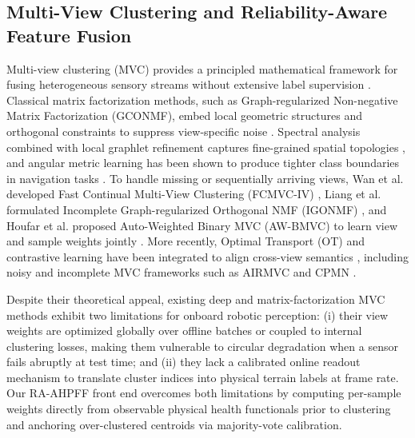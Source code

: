 \documentclass[11pt, a4paper]{article}
\begin{document}
\subsection{Multi-View Clustering and Reliability-Aware Feature Fusion}
Multi-view clustering (MVC) provides a principled mathematical framework for fusing heterogeneous sensory streams without extensive label supervision \cite{wang2024self, chowdhury2025deep, fang2023comprehensive}. Classical matrix factorization methods, such as Graph-regularized Non-negative Matrix Factorization (GCONMF), embed local geometric structures and orthogonal constraints to suppress view-specific noise \cite{zhang2018multi}. Spectral analysis combined with local graphlet refinement captures fine-grained spatial topologies \cite{xu2021multi}, and angular metric learning has been shown to produce tighter class boundaries in navigation tasks \cite{shi2023deep}. To handle missing or sequentially arriving views, Wan et al. developed Fast Continual Multi-View Clustering (FCMVC-IV) \cite{wan2023fast}, Liang et al. formulated Incomplete Graph-regularized Orthogonal NMF (IGONMF) \cite{liang2022incomplete}, and Houfar et al. proposed Auto-Weighted Binary MVC (AW-BMVC) to learn view and sample weights jointly \cite{houfar2023automatically}. More recently, Optimal Transport (OT) and contrastive learning have been integrated to align cross-view semantics \cite{zhang2024learning, lin2023multi, shen2023analysis}, including noisy and incomplete MVC frameworks such as AIRMVC \cite{airmvc2025} and CPMN \cite{cpmn2025}.

Despite their theoretical appeal, existing deep and matrix-factorization MVC methods exhibit two limitations for onboard robotic perception: (i) their view weights are optimized globally over offline batches or coupled to internal clustering losses, making them vulnerable to circular degradation when a sensor fails abruptly at test time; and (ii) they lack a calibrated online readout mechanism to translate cluster indices into physical terrain labels at frame rate. Our RA-AHPFF front end overcomes both limitations by computing per-sample weights directly from observable physical health functionals prior to clustering and anchoring over-clustered centroids via majority-vote calibration.
\end{document}
